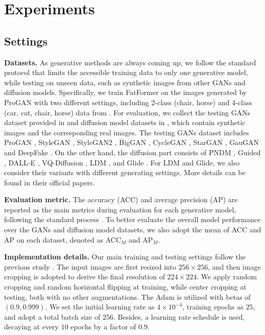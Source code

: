 \documentclass[10pt,twocolumn,letterpaper]{article}
\begin{document}
\section{Experiments}
\subsection{Settings}
\noindent \textbf{Datasets.}
As generative methods are always coming up, we follow the standard protocol \cite{wang2020cnn,ojha2023towards,tan2023learning} that limits the accessible training data to only one generative model, while testing on unseen data, such as synthetic images from other GANs and diffusion models. Specifically, we train FatFormer on the images generated by ProGAN \cite{karras2018progressive} with two different settings, including 2-class (chair, horse) and 4-class (car, cat, chair, horse) data from \cite{wang2020cnn}. For evaluation, we collect the testing GANs dataset provided in \cite{wang2020cnn} and diffusion model datasets in \cite{ojha2023towards,wang2023dire}, which contain synthetic images and the corresponding real images. The testing GANs dataset includes ProGAN \cite{karras2018progressive}, StyleGAN \cite{karras2019style}, StyleGAN2 \cite{karras2020analyzing}, BigGAN \cite{brock2018large}, CycleGAN \cite{zhu2017unpaired}, StarGAN \cite{choi2018stargan}, GauGAN \cite{park2019semantic} and DeepFake \cite{rossler2019faceforensics}. On the other hand, the diffusion part consists of PNDM \cite{liu2021pseudo}, Guided \cite{dhariwal2021diffusion}, DALL-E \cite{ramesh2021zero}, VQ-Diffusion \cite{gu2022vector}, LDM \cite{rombach2022high}, and Glide \cite{nichol2022glide}. For LDM and Glide, we also consider their variants with different generating settings. More details can be found in their official papers.

\noindent \textbf{Evaluation metric.}
The accuracy (ACC) and average precision (AP) are reported as the main metrics during evaluation for each generative model, following the standard process \cite{wang2020cnn,ojha2023towards,tan2023learning}. To better evaluate the overall model performance over the GANs and diffusion model datasets, we also adopt the mean of ACC and AP on each dataset, denoted as ACC$_M$ and AP$_M$. 

\noindent \textbf{Implementation details.}
Our main training and testing settings follow the previous study \cite{ojha2023towards}. The input images are first resized into $256 \times 256$, and then image cropping is adopted to derive the final resolution of $224 \times 224$. We apply random cropping and random horizontal flipping at training, while center cropping at testing, both with no other augmentations. The Adam \cite{kingma2014adam} is utilized with betas of $(0.9, 0.999)$. We set the initial learning rate as $4 \times 10^{-4}$, training epochs as $25$, and adopt a total batch size of $256$. Besides, a learning rate schedule is used, decaying at every $10$ epochs by a factor of $0.9$.
\end{document}
